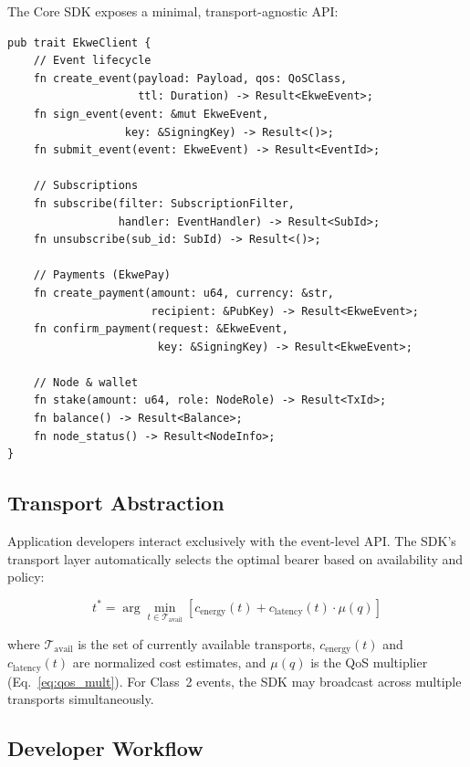 \documentclass[11pt,a4paper]{article}
\begin{document}
The Core SDK exposes a minimal, transport-agnostic API:

\begin{lstlisting}[caption={Core SDK interface (Rust).}]
pub trait EkweClient {
    // Event lifecycle
    fn create_event(payload: Payload, qos: QoSClass,
                    ttl: Duration) -> Result<EkweEvent>;
    fn sign_event(event: &mut EkweEvent,
                  key: &SigningKey) -> Result<()>;
    fn submit_event(event: EkweEvent) -> Result<EventId>;

    // Subscriptions
    fn subscribe(filter: SubscriptionFilter,
                 handler: EventHandler) -> Result<SubId>;
    fn unsubscribe(sub_id: SubId) -> Result<()>;

    // Payments (EkwePay)
    fn create_payment(amount: u64, currency: &str,
                      recipient: &PubKey) -> Result<EkweEvent>;
    fn confirm_payment(request: &EkweEvent,
                       key: &SigningKey) -> Result<EkweEvent>;

    // Node & wallet
    fn stake(amount: u64, role: NodeRole) -> Result<TxId>;
    fn balance() -> Result<Balance>;
    fn node_status() -> Result<NodeInfo>;
}
\end{lstlisting}

\subsection{Transport Abstraction}

Application developers interact exclusively with the event-level API. The SDK's transport layer automatically selects the optimal bearer based on availability and policy:

\begin{equation}
t^* = \arg\min_{t \in \mathcal{T}_{\text{avail}}} \left[ c_{\text{energy}}(t) + c_{\text{latency}}(t) \cdot \mu(q) \right]
\label{eq:transport_select}
\end{equation}

where $\mathcal{T}_{\text{avail}}$ is the set of currently available transports, $c_{\text{energy}}(t)$ and $c_{\text{latency}}(t)$ are normalized cost estimates, and $\mu(q)$ is the QoS multiplier (Eq.~\ref{eq:qos_mult}). For Class~2 events, the SDK may broadcast across multiple transports simultaneously.

\subsection{Developer Workflow}
\end{document}
